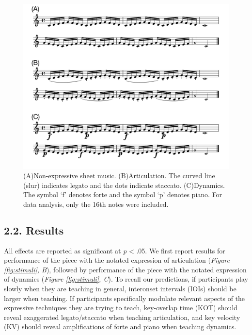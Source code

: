 \documentclass[
  english,
  man,floatsintext]{apa6}
\begin{document}
\begin{figure}
\includegraphics[width=1\linewidth]{manuscript_files/figure-latex/stim-1-1} \caption{\label{fig:stimuli}(A)Non-expressive sheet music. (B)Articulation. The curved line (slur) indicates legato and the dots indicate staccato. (C)Dynamics. The symbol `f' denotes forte and the symbol `p' denotes piano. For data analysis, only the 16th notes were included.}\label{fig:stim-1}
\end{figure}

\newpage

\hypertarget{results}{%
\subsection{2.2. Results}\label{results}}

All effects are reported as significant at \emph{p} \textless{} .05. We first report results for performance of the piece with the notated expression of articulation (\emph{Figure \ref{fig:stimuli}, B}), followed by performance of the piece with the notated expression of dynamics (\emph{Figure \ref{fig:stimuli}, C}). To recall our predictions, if participants play slowly when they are teaching in general, interonset intervals (IOIs) should be larger when teaching. If participants specifically modulate relevant aspects of the expressive techniques they are trying to teach, key-overlap time (KOT) should reveal exaggerated legato/staccato when teaching articulation, and key velocity (KV) should reveal amplifications of forte and piano when teaching dynamics.
\end{document}
